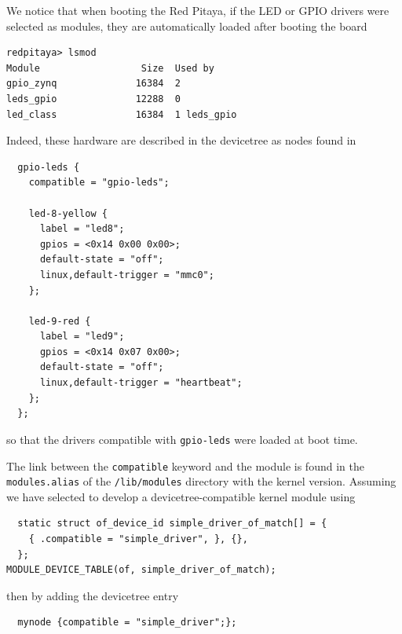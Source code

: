 \documentclass{article}
\begin{document}
{{{We notice that when booting the Red Pitaya, if the LED or GPIO drivers were selected as
modules, they are automatically loaded after booting the board

{\footnotesize
\begin{verbatim}
redpitaya> lsmod
Module                  Size  Used by
gpio_zynq              16384  2 
leds_gpio              12288  0 
led_class              16384  1 leds_gpio
\end{verbatim}
}

Indeed, these hardware are described in the devicetree as nodes found in

{\footnotesize
\begin{verbatim}
  gpio-leds {
    compatible = "gpio-leds";
 
    led-8-yellow {
      label = "led8";
      gpios = <0x14 0x00 0x00>;
      default-state = "off";
      linux,default-trigger = "mmc0";
    };
 
    led-9-red {
      label = "led9";
      gpios = <0x14 0x07 0x00>;
      default-state = "off";
      linux,default-trigger = "heartbeat";
    };
  };
\end{verbatim}
}

\noindent so that the drivers compatible with {\tt gpio-leds} were loaded at boot time. 

The link between the {\tt compatible} keyword and the module is found in the {\tt modules.alias} of 
the {\tt /lib/modules} directory with the kernel version. Assuming we have selected to develop a 
devicetree-compatible kernel module using 

{\footnotesize
\begin{verbatim}
  static struct of_device_id simple_driver_of_match[] = {
    { .compatible = "simple_driver", }, {},
  };
MODULE_DEVICE_TABLE(of, simple_driver_of_match);
\end{verbatim}
}

\noindent then by adding the devicetree entry

{\footnotesize
\begin{verbatim}
  mynode {compatible = "simple_driver";};
\end{verbatim}
}

}}}
\end{document}
